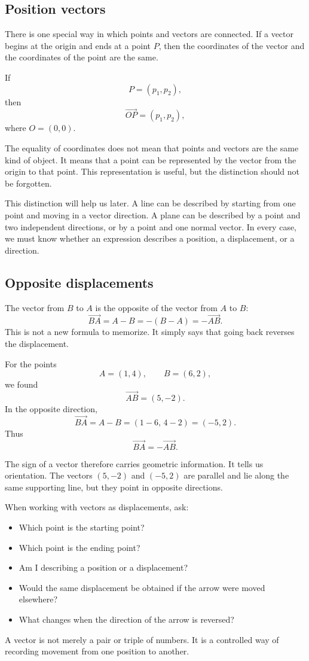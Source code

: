 \subsection*{Position vectors}

There is one special way in which points and vectors are connected. If a vector begins at the origin and ends at a point \(P\), then the coordinates of the vector and the coordinates of the point are the same.

If
\[
P=(p_1,p_2),
\]
then
\[
\overrightarrow{OP}=(p_1,p_2),
\]
where \(O=(0,0)\).

\begin{remarkbox}
The equality of coordinates does not mean that points and vectors are the same kind of object. It means that a point can be represented by the vector from the origin to that point. This representation is useful, but the distinction should not be forgotten.
\end{remarkbox}

This distinction will help us later. A line can be described by starting from one point and moving in a vector direction. A plane can be described by a point and two independent directions, or by a point and one normal vector. In every case, we must know whether an expression describes a position, a displacement, or a direction.

\subsection*{Opposite displacements}

The vector from \(B\) to \(A\) is the opposite of the vector from \(A\) to \(B\):
\[
\overrightarrow{BA}=A-B=-(B-A)=-\overrightarrow{AB}.
\]
This is not a new formula to memorize. It simply says that going back reverses the displacement.

\begin{examplebox}
For the points
\[
A=(1,4),
\qquad
B=(6,2),
\]
we found
\[
\overrightarrow{AB}=(5,-2).
\]
In the opposite direction,
\[
\overrightarrow{BA}=A-B=(1-6,\,4-2)=(-5,2).
\]
Thus
\[
\overrightarrow{BA}=-\overrightarrow{AB}.
\]
\end{examplebox}

The sign of a vector therefore carries geometric information. It tells us orientation. The vectors \((5,-2)\) and \((-5,2)\) are parallel and lie along the same supporting line, but they point in opposite directions.

\begin{summarybox}
When working with vectors as displacements, ask:
\begin{itemize}
\item Which point is the starting point?
\item Which point is the ending point?
\item Am I describing a position or a displacement?
\item Would the same displacement be obtained if the arrow were moved elsewhere?
\item What changes when the direction of the arrow is reversed?
\end{itemize}
\end{summarybox}

A vector is not merely a pair or triple of numbers. It is a controlled way of recording movement from one position to another.
